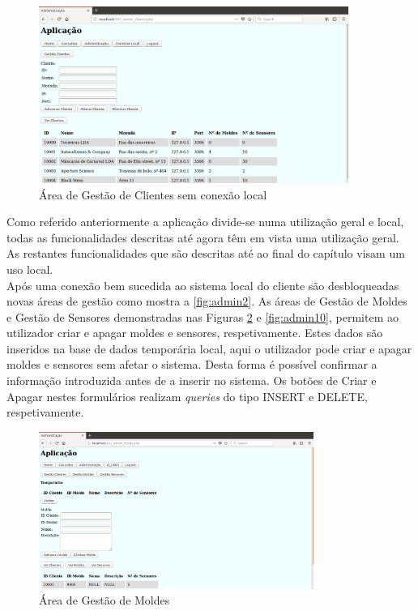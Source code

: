 \documentclass[11pt,twoside,a4paper]{report}
\begin{document}
\\
\\
\\
\\
\\
\\
\\
\\
\\
\\
\begin{figure}[H]
	\begin{center}
		\includegraphics[width=0.9\textwidth]{administracao02} %
		\caption{Área de Gestão de Clientes sem conexão local}
		\label{fig:admin3}
	\end{center}
\end{figure}
\newpage
Como referido anteriormente a aplicação divide-se numa utilização geral e local, todas as funcionalidades descritas até agora têm em vista uma utilização geral. As restantes funcionalidades que são descritas até ao final do capítulo visam um uso local.\\
Após uma conexão bem sucedida ao sistema local do cliente são desbloqueadas novas áreas de gestão como mostra a \autoref{fig:admin2}. As áreas de Gestão de Moldes e Gestão de Sensores demonstradas nas Figuras \ref{fig:admin9} e \ref{fig:admin10}, permitem ao utilizador criar e apagar moldes e sensores, respetivamente. Estes dados são inseridos na base de dados temporária local, aqui o utilizador pode criar e apagar moldes e sensores sem afetar o sistema. Desta forma é possível confirmar a informação introduzida antes de a inserir no sistema. Os botões de Criar e Apagar nestes formulários realizam \textit{queries} do tipo INSERT e DELETE, respetivamente.
	\begin{figure}[H]
		\centering
			\includegraphics[width=0.8\textwidth]{administracao05} %
			\caption{Área de Gestão de Moldes}
			\label{fig:admin9}
	\end{figure}
\end{document}
